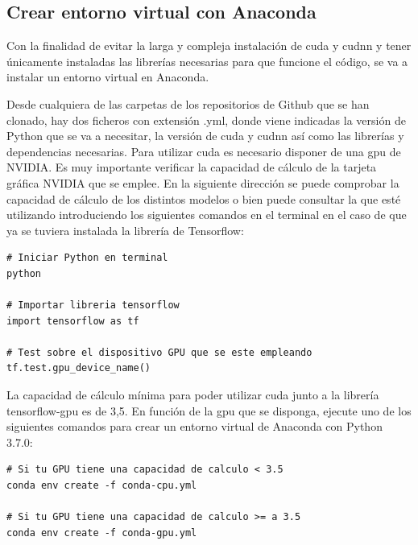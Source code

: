 \subsection{Crear entorno virtual con Anaconda}
\label{subsec:creacion-entorno}

Con la finalidad de evitar la larga y compleja instalación de \gls{cuda} y \gls{cudnn} y tener únicamente instaladas las librerías necesarias para que funcione el código, se va a instalar un entorno virtual en Anaconda.

Desde cualquiera de las carpetas de los repositorios de Github que se han clonado, hay dos ficheros con extensión .yml, donde viene indicadas la versión de Python que se va a necesitar, la versión de \gls{cuda} y \gls{cudnn} así como las librerías y dependencias necesarias. Para utilizar \gls{cuda} es necesario disponer de una \gls{gpu} de NVIDIA. Es muy importante verificar la capacidad de cálculo de la tarjeta gráfica NVIDIA que se emplee. En la siguiente dirección \cite{cuda-gpus} se puede comprobar la capacidad de cálculo de los distintos modelos o bien puede consultar la que esté utilizando introduciendo los siguientes comandos en el terminal en el caso de que ya se tuviera instalada la librería de Tensorflow:

\vspace{0.5cm}

\begin{lstlisting}[language=iPython,caption=Comprobar capacidad computación de la GPU,captionpos=b,label={lst:check-compute-capability}]
# Iniciar Python en terminal
python

# Importar libreria tensorflow
import tensorflow as tf

# Test sobre el dispositivo GPU que se este empleando
tf.test.gpu_device_name()
\end{lstlisting}

La capacidad de cálculo mínima para poder utilizar \gls{cuda} junto a la librería tensorflow-gpu es de 3,5. En función de la \gls{gpu} que se disponga, ejecute uno de los siguientes comandos para crear un entorno virtual de Anaconda con Python 3.7.0:

\vspace{0.5cm}

\begin{lstlisting}[language=iPython,caption=Creación entorno virtual en Anaconda,captionpos=b,label={lst:crear-env}]
# Si tu GPU tiene una capacidad de calculo < 3.5
conda env create -f conda-cpu.yml

# Si tu GPU tiene una capacidad de calculo >= a 3.5
conda env create -f conda-gpu.yml
\end{lstlisting}


